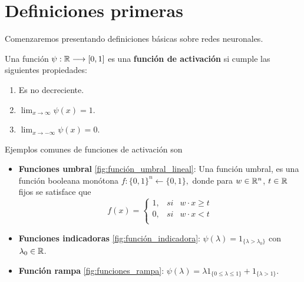 %

\section{Definiciones primeras}\label{ch:articulo:sec:defincionesPrimeras}  

Comenzaremos presentando definiciones básicas sobre redes neuronales. 

\begin{definicion} \label{def:funcion_activacion_articulo}
    Una función  $\psi: \mathbb{R} \longrightarrow [0,1]$ es una \textbf{ función de activación} si  cumple las siguientes propiedades:
    \begin{enumerate}[label=(\roman*)]
        \item Es no decreciente.
        \item $\lim _{x \rightarrow \infty} \psi(x) = 1
        $.
        \item $\lim _{x \rightarrow -\infty} \psi(x) = 0$.
    \end{enumerate}  
   
    Ejemplos comunes de funciones de activación son
    \begin{itemize}
        \item \textbf{Funciones umbral} \ref{fig:función_umbral_lineal}:
        Una función umbral, es una función booleana monótona $f: \{0,1\}^n \longleftarrow \{0,1\},$ 
        donde para $w \in \mathbb{R}^n$, $t \in \mathbb{R}$ fijos se
        satisface que 
        \begin{equation}
            f(x) = \left\{
                \begin{array}{lcc}
                    1, &   si  & w \cdot x \geq t \\
                    0, &  si & w \cdot x < t\\
                    \end{array}
            \right.
        \end{equation}
    
        \item \textbf{Funciones indicadoras} \ref{fig:función_indicadora}: $\psi(\lambda) = 1_{\{\lambda > \lambda_0\}}$ con $\lambda_0 \in \mathbb{R}$. 
        \item \textbf{Función rampa} \ref{fig:funciones_rampa}: $\psi(\lambda)  = \lambda 1_{\{0 \leq \lambda \leq  1\}} + 1_{\{\lambda > 1\}}.$
    

\end{itemize}
\end{definicion}
